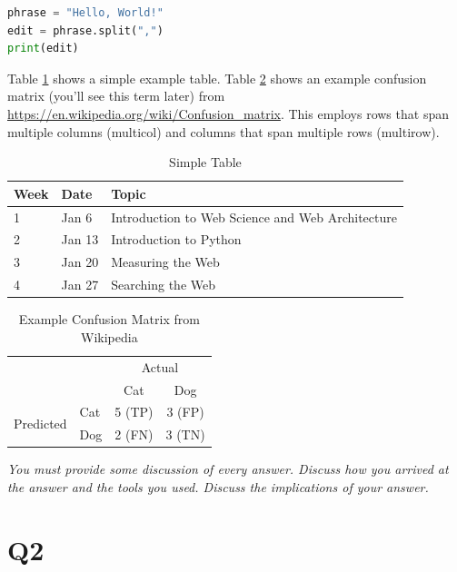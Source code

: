 \documentclass[12pt]{article}
\begin{document}
\begin{lstlisting}[language=Python, caption=Simple Python script for separating a string, label=lst:copy]
phrase = "Hello, World!"
edit = phrase.split(",")
print(edit)
\end{lstlisting}



Table \ref{tbl:simple} shows a simple example table.  Table \ref{tbl:confusion} shows an example confusion matrix (you'll see this term later) from \url{https://en.wikipedia.org/wiki/Confusion_matrix}. This employs rows that span multiple columns (multicol) and columns that span multiple rows (multirow). 

\begin{table}[h]
\centering
\caption{Simple Table}
\label{tbl:simple}
\begin{tabular}{|l|l|l|}
\hline
\textbf{Week} & \textbf{Date} & \textbf{Topic} \\ \hline \hline
1 & Jan 6 & Introduction to Web Science and Web Architecture \\ \hline
2 & Jan 13 & Introduction to Python \\ \hline
3 & Jan 20 & Measuring the Web \\ \hline
4 & Jan 27 & Searching the Web \\ \hline
\end{tabular}
\end{table}

\begin{table}[h]
\centering
\caption{Example Confusion Matrix from Wikipedia}
\label{tbl:confusion}
\begin{tabular}{l|l|c|c|}
\multicolumn{2}{c}{}&\multicolumn{2}{c}{Actual}\\
\cline{3-4}
\multicolumn{2}{c|}{}&Cat&Dog\\
\cline{2-4}
\multirow{2}{*}{Predicted}& Cat & 5 (TP) & 3 (FP)\\
\cline{2-4}
& Dog & 2 (FN) & 3 (TN) \\
\cline{2-4}
\end{tabular}
\end{table}

\emph{You must provide some discussion of every answer. Discuss how you arrived at the answer and the tools you used. Discuss the implications of your answer.}

\section*{Q2}
\end{document}
